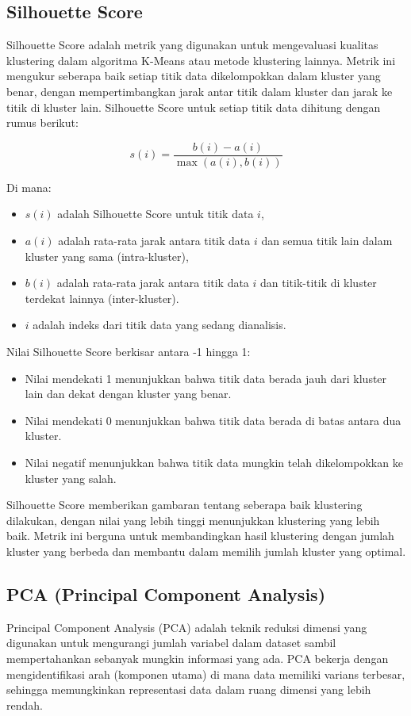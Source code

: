 \subsection{Silhouette Score}
Silhouette Score adalah metrik yang digunakan untuk mengevaluasi kualitas klustering dalam algoritma K-Means atau metode klustering lainnya. Metrik ini mengukur seberapa baik setiap titik data dikelompokkan dalam kluster yang benar, dengan mempertimbangkan jarak antar titik dalam kluster dan jarak ke titik di kluster lain.
Silhouette Score untuk setiap titik data dihitung dengan rumus berikut:

\begin{equation}
    s(i) = \frac{b(i) - a(i)}{\max(a(i), b(i))}
\end{equation}

Di mana:
\begin{itemize}
    \item \(s(i)\) adalah Silhouette Score untuk titik data \(i\),
    \item \(a(i)\) adalah rata-rata jarak antara titik data \(i\) dan semua titik lain dalam kluster yang sama (intra-kluster),
    \item \(b(i)\) adalah rata-rata jarak antara titik data \(i\) dan titik-titik di kluster terdekat lainnya (inter-kluster).
    \item \(i\) adalah indeks dari titik data yang sedang dianalisis.
\end{itemize}

Nilai Silhouette Score berkisar antara -1 hingga 1:
\begin{itemize}
    \item Nilai mendekati 1 menunjukkan bahwa titik data berada jauh dari kluster lain dan dekat dengan kluster yang benar.
    \item Nilai mendekati 0 menunjukkan bahwa titik data berada di batas antara dua kluster.
    \item Nilai negatif menunjukkan bahwa titik data mungkin telah dikelompokkan ke kluster yang salah.
\end{itemize}

Silhouette Score memberikan gambaran tentang seberapa baik klustering dilakukan, dengan nilai yang lebih tinggi menunjukkan klustering yang lebih baik. Metrik ini berguna untuk membandingkan hasil klustering dengan jumlah kluster yang berbeda dan membantu dalam memilih jumlah kluster yang optimal.

\subsection{PCA (Principal Component Analysis)}
Principal Component Analysis (PCA) adalah teknik reduksi dimensi yang digunakan untuk mengurangi jumlah variabel dalam dataset sambil mempertahankan sebanyak mungkin informasi yang ada. PCA bekerja dengan mengidentifikasi arah (komponen utama) di mana data memiliki varians terbesar, sehingga memungkinkan representasi data dalam ruang dimensi yang lebih rendah.


